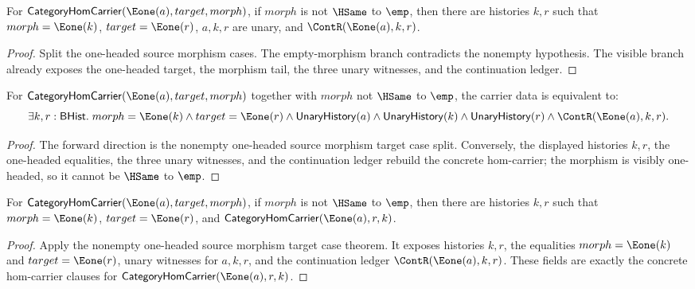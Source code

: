 \begin{theorem}
\label{thm:category-e1-source-nonempty-morphism-target-cases}
For $\mathsf{CategoryHomCarrier}(\Eone(a),target,morph)$, if $morph$ is not
$\HSame$ to $\emp$, then there are histories $k,r$ such that
$morph=\Eone(k)$, $target=\Eone(r)$, $a,k,r$ are unary, and
$\ContR(\Eone(a),k,r)$.
\end{theorem}
\begin{proof}
Split the one-headed source morphism cases. The empty-morphism branch
contradicts the nonempty hypothesis. The visible branch already exposes the
one-headed target, the morphism tail, the three unary witnesses, and the
continuation ledger.
\end{proof}

\begin{theorem}
\label{thm:category-hom-carrier-e1-source-nonempty-morphism-target-iff}
For $\mathsf{CategoryHomCarrier}(\Eone(a),target,morph)$ together with
$morph$ not $\HSame$ to $\emp$, the carrier data is equivalent to:
$$
\exists k,r:\mathsf{BHist}.\;
morph=\Eone(k)\land target=\Eone(r)\land
\mathsf{UnaryHistory}(a)\land\mathsf{UnaryHistory}(k)\land
\mathsf{UnaryHistory}(r)\land\ContR(\Eone(a),k,r).
$$
\end{theorem}
\begin{proof}
The forward direction is the nonempty one-headed source morphism target case
split. Conversely, the displayed histories $k,r$, the one-headed equalities,
the three unary witnesses, and the continuation ledger rebuild the concrete
hom-carrier; the morphism is visibly one-headed, so it cannot be $\HSame$ to
$\emp$.
\end{proof}

\begin{theorem}
\label{thm:category-hom-carrier-e1-source-nonempty-morphism-target-carrier-cases}
For $\mathsf{CategoryHomCarrier}(\Eone(a),target,morph)$, if $morph$ is not
$\HSame$ to $\emp$, then there are histories $k,r$ such that
$morph=\Eone(k)$, $target=\Eone(r)$, and
$\mathsf{CategoryHomCarrier}(\Eone(a),r,k)$.
\end{theorem}
\begin{proof}
Apply the nonempty one-headed source morphism target case theorem. It exposes
histories $k,r$, the equalities $morph=\Eone(k)$ and $target=\Eone(r)$, unary
witnesses for $a,k,r$, and the continuation ledger $\ContR(\Eone(a),k,r)$.
These fields are exactly the concrete hom-carrier clauses for
$\mathsf{CategoryHomCarrier}(\Eone(a),r,k)$.
\end{proof}

